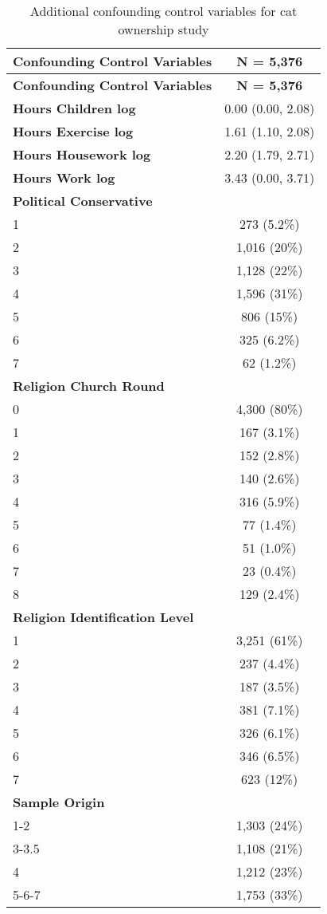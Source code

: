 \documentclass[
  singlecolumn,
  9pt]{article}
\begin{document}
\newpage{}

\begin{longtable}[]{@{}lc@{}}
\caption{Additional confounding control variables for cat ownership
study}\label{tbl-table_confounding_control_vars_cats-m}\tabularnewline
\toprule\noalign{}
\textbf{Confounding Control Variables} & \textbf{N = 5,376} \\
\midrule\noalign{}
\endfirsthead
\toprule\noalign{}
\textbf{Confounding Control Variables} & \textbf{N = 5,376} \\
\midrule\noalign{}
\endhead
\bottomrule\noalign{}
\endlastfoot
\textbf{Hours Children log} & 0.00 (0.00, 2.08) \\
\textbf{Hours Exercise log} & 1.61 (1.10, 2.08) \\
\textbf{Hours Housework log} & 2.20 (1.79, 2.71) \\
\textbf{Hours Work log} & 3.43 (0.00, 3.71) \\
\textbf{Political Conservative} & \\
1 & 273 (5.2\%) \\
2 & 1,016 (20\%) \\
3 & 1,128 (22\%) \\
4 & 1,596 (31\%) \\
5 & 806 (15\%) \\
6 & 325 (6.2\%) \\
7 & 62 (1.2\%) \\
\textbf{Religion Church Round} & \\
0 & 4,300 (80\%) \\
1 & 167 (3.1\%) \\
2 & 152 (2.8\%) \\
3 & 140 (2.6\%) \\
4 & 316 (5.9\%) \\
5 & 77 (1.4\%) \\
6 & 51 (1.0\%) \\
7 & 23 (0.4\%) \\
8 & 129 (2.4\%) \\
\textbf{Religion Identification Level} & \\
1 & 3,251 (61\%) \\
2 & 237 (4.4\%) \\
3 & 187 (3.5\%) \\
4 & 381 (7.1\%) \\
5 & 326 (6.1\%) \\
6 & 346 (6.5\%) \\
7 & 623 (12\%) \\
\textbf{Sample Origin} & \\
1-2 & 1,303 (24\%) \\
3-3.5 & 1,108 (21\%) \\
4 & 1,212 (23\%) \\
5-6-7 & 1,753 (33\%) \\
\end{longtable}
\end{document}
